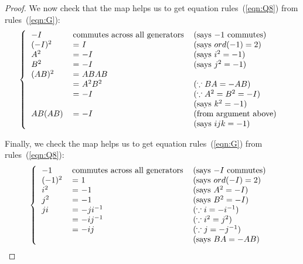 \documentclass{article}
\begin{document}
\begin{enumerate}
\begin{enumerate}
\begin{proof}
          We now check that the map helps us to get equation
          rules~(\ref{eqn:Q8}) from rules~(\ref{eqn:G}):
          \[\left \{
            \begin{tabular}{lll}
              $-I$      & commutes across all generators
                                        & (says $-1$ commutes) \\
              $(-I)^2$  & = $I$         & (says $ord(-1) = 2$) \\
              $A^2$     & = $-I$        & (says $i^2=-1$) \\
              $B^2$     & = $-I$        & (says $j^2=-1$) \\
              $(AB)^2$  & = $ABAB$      & \\
                        & = $A^2B^2$    & ($\because BA=-AB$) \\
                        & = $-I$        & ($\because A^2=B^2=-I$) \\
                        &               & (says $k^2=-1$) \\
              $AB(AB)$  & = $-I$        & (from argument above) \\
                        &               & (says $ijk=-1$) \\
            \end{tabular}
          \right .\ \]

          Finally, we check the map helps us to get equation
          rules~(\ref{eqn:G}) from rules~(\ref{eqn:Q8}):
          \[\left \{
            \begin{tabular}{lll}
              $-1$      & commutes across all generators
                                        & (says $-I$ commutes) \\
              $(-1)^2$  & = $1$         & (says $ord(-I) = 2$) \\
              $i^2$     & = $-1$        & (says $A^2=-I$) \\
              $j^2$     & = $-1$        & (says $B^2=-I$) \\
              $ji$      & = $-ji^{-1}$  & ($\because i=-i^{-1}$) \\
                        & = $-ij^{-1}$  & ($\because i^2=j^2$) \\
                        & = $-ij$       & ($\because j=-j^{-1}$) \\
                        &               & (says $BA=-AB$) \\
            \end{tabular}
          \right .\ \]
        \end{proof}
    \end{enumerate}


\end{enumerate}
\end{document}
